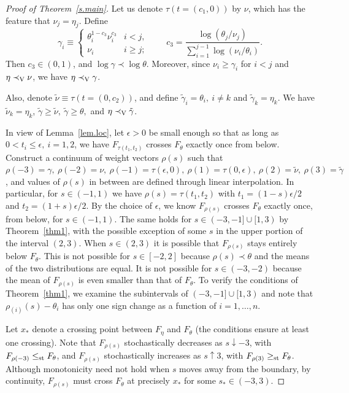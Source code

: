 \documentclass[11pt]{article}
\begin{document}
\begin{proof}[Proof of Theorem~\ref{s.main}]
Let us denote $\tau(t=(c_1, 0))$ by $\nu$, which has the feature that $\nu_j = \eta_j$.  Define 
$$\gamma_i \equiv \begin{cases} 
\theta_i^{1-c_3} \nu_i^{c_3} & i<j,\\
\nu_i & i\geq j; 
\end{cases}
\quad \quad 
c_3= \frac{\log (\theta_j/ \nu_j) }{\sum_{i=1}^{j-1} \log (\nu_i /\theta_i)}.$$ 
Then $c_3\in (0, 1)$, and $\log\gamma\prec \log\theta$.  Moreover, since $\nu_i\geq \gamma_i$ for $i<j$ and $\eta\prec_{\rm V} \nu$, we have $\eta\prec_{\rm V} \gamma$. 

Also, denote $\tilde{\nu}\equiv \tau(t=(0, c_2))$, and define $\tilde{\gamma}_i = \theta_i,\ i\neq k$ and $\tilde{\gamma}_k = \eta_k$.  We have $\tilde{\nu}_k = \eta_k$, $\tilde{\gamma}\geq \tilde{\nu},\ \tilde{\gamma}\geq \theta,$ and $\eta\prec_{\rm V} \tilde{\gamma}$. 

In view of Lemma~\ref{lem.loc}, let $\epsilon>0$ be small enough so that as long as $0<t_i\leq \epsilon,\ i=1,2$, we have $F_{\tau(t_1, t_2)}$ crosses $F_\theta$ exactly once from below.  Construct a continuum of weight vectors $\rho(s)$ such that $\rho(-3) = \gamma,\ \rho(-2) = \nu,\ \rho(-1) = \tau(\epsilon, 0),\ \rho(1) = \tau(0, \epsilon),\ \rho(2) =\tilde{\nu},\ \rho(3)= \tilde{\gamma}$, and values of $\rho(s)$ in between are defined through linear interpolation.  In particular, for $s\in (-1, 1)$ we have $\rho(s) = \tau(t_1, t_2)$ with $t_1=(1-s)\epsilon/2$ and $t_2 = (1+s)\epsilon/2$.  By the choice of $\epsilon$, we know $F_{\rho(s)}$ crosses $F_\theta$ exactly once, from below, for $s\in (-1, 1)$.  The same holds for $s\in (-3, -1]\cup [1,3)$ by Theorem~\ref{thm1}, with the possible exception of some $s$ in the upper portion of the interval $(2, 3)$.  When $s\in (2, 3)$ it is possible that $F_{\rho(s)}$ stays entirely below $F_\theta$.  This is not possible for $s\in [-2, 2]$ because $\rho(s)\prec \theta$ and the means of the two distributions are equal.  It is not possible for $s\in (-3, -2)$ because the mean of $F_{\rho(s)}$ is even smaller than that of $F_\theta$.  To verify the conditions of Theorem~\ref{thm1}, we examine the subintervals of $(-3, -1]\cup [1,3)$ and note that $\rho_{(i)}(s) - \theta_i$ has only one sign change as a function of $i=1,\ldots, n$. 

Let $x_*$ denote a crossing point between $F_\eta$ and $F_\theta$ (the conditions ensure at least one crossing).  Note that $F_{\rho(s)}$  stochastically decreases as $s\downarrow -3$, with $F_{\rho(-3)}\leq_{\rm st} F_\theta$, and $F_{\rho(s)}$ stochastically increases as $s\uparrow 3$, with $F_{\rho(3)} \geq_{\rm st} F_\theta$.  Although monotonicity need not hold when $s$ moves away from the boundary, by continuity, $F_{\rho(s)}$ must cross $F_\theta$ at precisely $x_*$ for some $s_*\in (-3, 3)$. 


\end{proof}
\end{document}
